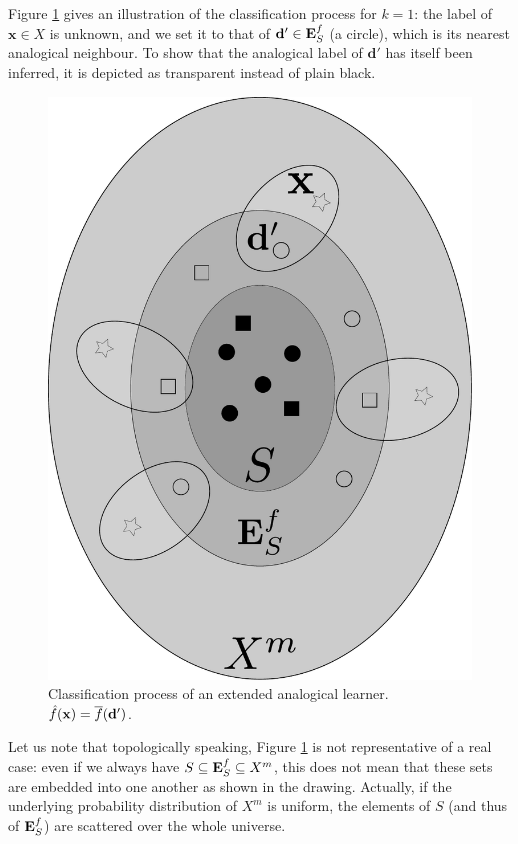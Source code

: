 Figure \ref{FIG:extended_classifier} gives an illustration of the classification process for
$k = 1$: the
label of $\mathbf{x} \in X$ is unknown, and we set it to that of $\mathbf{d}'
\in \mathbf{E}_{S}^{f}$ (a circle), which is its nearest analogical neighbour. To show that
the analogical label of $\mathbf{d}'$ has itself been inferred, it is depicted
as transparent instead of plain black.
\begin{figure}
\begin{center}
\includegraphics[scale=0.20]{figures/extended_classifier.pdf}
\end{center}
  \caption{Classification process of an extended analogical learner.
  $\hat{f}(\mathbf{x}) = \overline{f}(\mathbf{d}')$.}
\label{FIG:extended_classifier}
\end{figure}
Let us note that topologically speaking, Figure \ref{FIG:extended_classifier}
is not representative of a real case: even if we always have $S \subseteq \mathbf{E}_{S}^{f}
\subseteq X^m$, this does not mean that these sets are embedded into one
another as shown in the drawing. Actually, if the underlying probability
distribution of $X^m$ is uniform, the elements of $S$ (and thus of $\mathbf{E}_{S}^{f}$) are
scattered over the whole universe.


